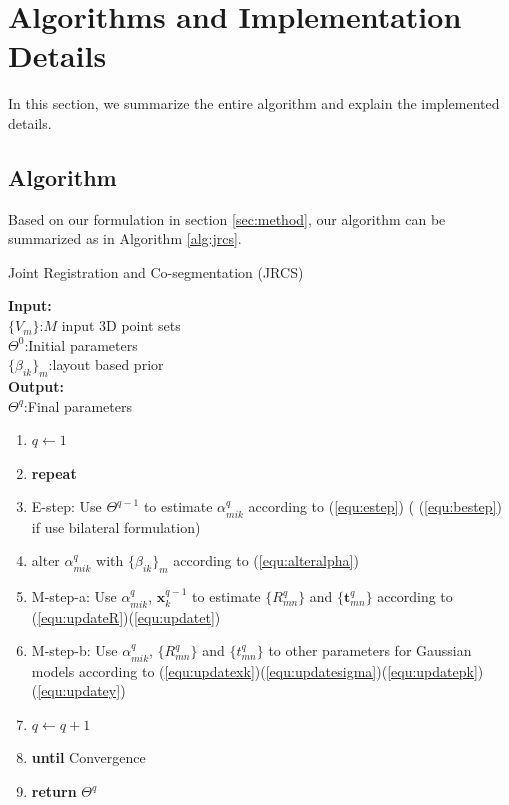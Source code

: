 \section{Algorithms and Implementation Details}
\label{sec:imp}
In this section, we summarize the entire algorithm and explain the implemented details.\\ 
\subsection{Algorithm}
Based on our formulation in section \ref{sec:method}, our algorithm can be summarized as in Algorithm \ref{alg:jrcs}.
\begin{algorithm}[htb]
	\caption{Joint Registration and Co-segmentation (JRCS)}
	\label{alg:jrcs}
	\textbf{Input:}~~\\
	$\{V_m\}$:$M$ input 3D point sets\\
	$\Theta^0$:Initial parameters~~\\
	$\{\beta_{ik}\}_{m}$:layout based prior\\
	\textbf{Output:}~~\\
	$\Theta^q$:Final parameters~~
	\begin{enumerate}
		\item $q\leftarrow1$
		\item \textbf{repeat}
		\item E-step: Use $\Theta^{q-1}$ to estimate $\alpha_{mik}^q$ according to (\ref{equ:estep}) ( (\ref{equ:bestep}) if use bilateral formulation)
		\item alter $\alpha_{mik}^q$ with $\{\beta_{ik}\}_{m}$ according to (\ref{equ:alteralpha})
		\item M-step-a: Use $\alpha^q_{mik}$, $\pmb x^{q-1}_k$ to estimate $\{R_{mn}^q\}$ and $\{\pmb t_{mn}^q\}$ according to (\ref{equ:updateR})(\ref{equ:updatet})
		\item M-step-b: Use $\alpha^q_{mik}$, $\{R_{mn}^q\}$ and $\{t_{mn}^q\}$ to other parameters for Gaussian models according to (\ref{equ:updatexk})(\ref{equ:updatesigma})(\ref{equ:updatepk})(\ref{equ:updatey})
		\item $q \leftarrow q+1$
		\item \textbf{until} Convergence
		\item \textbf{return} $\Theta^q$
	\end{enumerate}
\end{algorithm}
